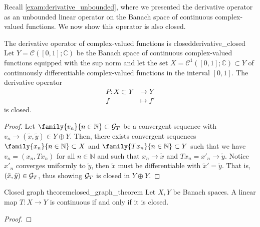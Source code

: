 Recall \cref{exam:derivative_unbounded}, where we presented the derivative operator as an unbounded linear operator on the Banach space of continuous complex-valued functions. We now show this operator is also closed.
\begin{example}{The derivative operator of complex-valued functions is closed}{derivative_closed}
    Let \(Y = \mathcal{C}([0,1]; \mathbb{C})\) be the Banach space of continuous complex-valued functions equipped with the sup norm and let the set \(X = \mathcal{C}^1([0,1];\mathbb{C})\subset Y\) of continuously differentiable complex-valued functions in the interval \([0,1]\). The derivative operator
    \begin{align*}
        P : X \subset Y &\to Y\\
            f &\mapsto f'
    \end{align*}
    is closed.
\end{example}
\begin{proof}
    Let \(\family{v_n}{n \in \mathbb{N}} \subset \graph{T}\) be a convergent sequence with \(v_n \to (\tilde{x}, \tilde{y}) \in Y \oplus Y\). Then, there exists convergent sequences \(\family{x_n}{n \in \mathbb{N}} \subset X\) and \(\family{Tx_n}{n \in \mathbb{N}} \subset Y\) such that we have \(v_n = (x_n, Tx_n)\) for all \(n \in \mathbb{N}\) and such that \(x_n \to \tilde{x}\) and \(Tx_n = x'_n \to \tilde{y}\). Notice \(x'_n\) converges uniformly to \(\tilde{y}\), then \(\tilde{x}\) must be differentiable with \(\tilde{x}' = \tilde{y}\). That is, \((\tilde{x}, \tilde{y}) \in \mathcal{G}_{T}\), thus showing \(\mathcal{G}_{T}\) is closed in \(Y \oplus Y\).
\end{proof}

\begin{theorem}{Closed graph theorem}{closed_graph_theorem}
    Let \(X, Y\) be Banach spaces. A linear map \(T : X \to Y\) is continuous if and only if it is closed.
\end{theorem}
\begin{proof}
\end{proof}

